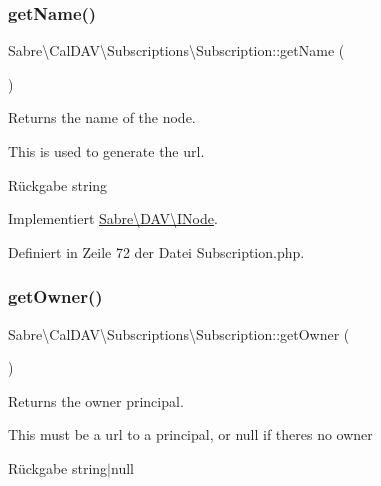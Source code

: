 \subsubsection{\texorpdfstring{get\+Name()}{getName()}}
{\footnotesize\ttfamily Sabre\textbackslash{}\+Cal\+D\+A\+V\textbackslash{}\+Subscriptions\textbackslash{}\+Subscription\+::get\+Name (\begin{DoxyParamCaption}{ }\end{DoxyParamCaption})}

Returns the name of the node.

This is used to generate the url.

\begin{DoxyReturn}{Rückgabe}
string 
\end{DoxyReturn}


Implementiert \mbox{\hyperlink{interface_sabre_1_1_d_a_v_1_1_i_node_ab616fe836b1ae36af12126a2bc934dce}{Sabre\textbackslash{}\+D\+A\+V\textbackslash{}\+I\+Node}}.



Definiert in Zeile 72 der Datei Subscription.\+php.

\mbox{\label{class_sabre_1_1_cal_d_a_v_1_1_subscriptions_1_1_subscription_a3a73ec58f4ea3410a5341d7af1611d20}} 
\subsubsection{\texorpdfstring{get\+Owner()}{getOwner()}}
{\footnotesize\ttfamily Sabre\textbackslash{}\+Cal\+D\+A\+V\textbackslash{}\+Subscriptions\textbackslash{}\+Subscription\+::get\+Owner (\begin{DoxyParamCaption}{ }\end{DoxyParamCaption})}

Returns the owner principal.

This must be a url to a principal, or null if there\textquotesingle{}s no owner

\begin{DoxyReturn}{Rückgabe}
string$\vert$null 
\end{DoxyReturn}


